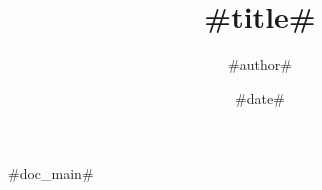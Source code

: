 \documentclass[9pt,xcolor=pst,dvipsnames]{beamer}
\title[#short_title#]
  {#title#}
\subtitle{}
\author[#short_author#]
  {#author#}
\institute[\color{Gray}{#university#}]
  {#institute#}
\date[#short_date#] 
  {#date#}
\begin{document}


#doc_main#
\end{document}
